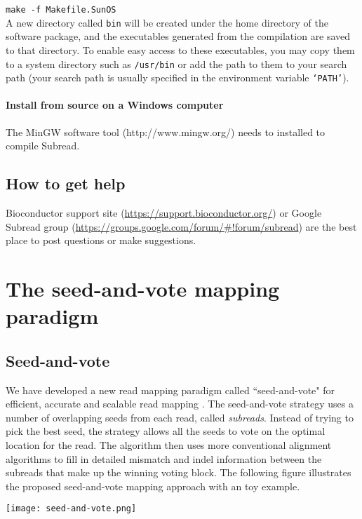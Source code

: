 \documentclass[12pt]{report}
\newcommand{\code}[1]{{\small\texttt{#1}}}
\begin{document}
\code{make -f Makefile.SunOS}\\

A new directory called \code{bin} will be created under the home directory of the software package, and the executables generated from the compilation are saved to that directory.
To enable easy access to these executables, you may copy them to a system directory such as \code{/usr/bin} or add the path to them to your search path (your search path is usually specified in the environment variable \code{`PATH'}).

\subsubsection{Install from source on a Windows computer}

The MinGW software tool  (http://www.mingw.org/) needs to installed to compile Subread.

\section{How to get help}

Bioconductor support site (\url{https://support.bioconductor.org/}) or Google Subread group (\url{https://groups.google.com/forum/#!forum/subread}) are the best place to post questions or make suggestions.


\chapter{The seed-and-vote mapping paradigm}

\section{Seed-and-vote}

We have developed a new read mapping paradigm called ``seed-and-vote" for efficient, accurate and scalable read mapping \cite{liao}.
The seed-and-vote strategy uses a number of overlapping seeds from each read, called \emph{subreads}.
Instead of trying to pick the best seed, the strategy allows all the seeds to vote on the optimal location for the read.
The algorithm then uses more conventional alignment algorithms to fill in detailed mismatch and indel information between the subreads that make up the winning voting block. 
The following figure illustrates the proposed seed-and-vote mapping approach with an toy example.

\begin{center}
\texttt{[image: seed-and-vote.png]}
\end{center}
\end{document}

